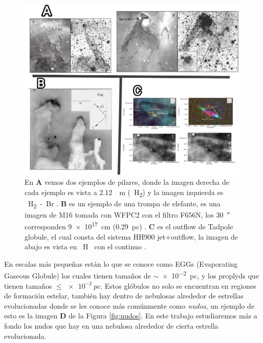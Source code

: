 \documentclass{book}
\begin{document}
\begin{figure}[htb]
    \centering
    \includegraphics[width=1 \textwidth]{images Chapter 1/C1_Pillars.jpg}
    \caption{En \textbf{A} vemos dos ejemplos de pilares, donde la imagen derecha de cada ejemplo es vista a \SI{2.12}{\mu m} (\SI{}{H_2}) y la imagen izquierda es \SI{}{H_2-Br_{\gamma}} \citep{Hartigan:2015}. \textbf{B} es un ejemplo de una trompa de elefante, es una imagen de M16 tomada con WFPC2 con el filtro F656N, los \SI{30}{\arcsecond} corresponden \SI{9e17}{cm} (\SI{0.29}{pc}) \citep{JJHester:1996}. \textbf{C} es el outflow de Tadpole globule, el cual consta del sistema HH900 jet+outflow, la imagen de abajo es vista en \SI{}{H\alpha} con el continuo 
    \citep{MeganReiter:2019}. }
    \label{fig:Pillars}
\end{figure}

En escalas más pequeñas están lo que se conoce como EGGs (Evaporating Gaseous Globule) los cuales tienen tamaños de $\sim$\SI{e-2}{pc}, y los proplyds que tienen tamaños $\le\SI{e-2}{pc}$. 
Estos glóbulos no solo se encuentran en regiones de formación estelar, también hay dentro de nebulosas alrededor de estrellas evolucionadas donde se les conoce más comúnmente como \textit{nudos}, un ejemplo de esto es la imagen \textbf{D} de la Figura \ref{fig:nudos}. En este trabajo estudiaremos más a fondo los nudos que hay en una nebulosa alrededor de cierta estrella evolucionada.
\end{document}
